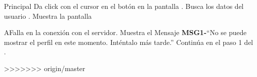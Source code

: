 	\begin{UCtrayectoria}{Principal}
		\UCpaso[\UCactor] Da click con el cursor en el botón  en la pantalla .
		\UCpaso Busca los datos del usuario .
		\UCpaso Muestra la pantalla 
	\end{UCtrayectoria}
	
		\begin{UCtrayectoriaA}{A}{Falla en la conexión con el servidor.}
			\UCpaso Muestra el Mensaje {\bf MSG1-}``No se puede mostrar el perfil en este momento. Inténtalo más tarde.''
			\UCpaso Continúa en el paso 1 del .
		\end{UCtrayectoriaA}

>>>>>>> origin/master
